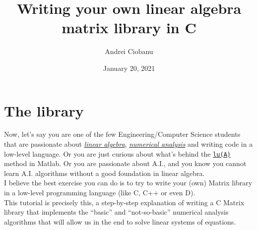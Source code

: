 

\usepackage{titling}
\usepackage{alltt}
\usepackage{multirow}
\usepackage{graphicx}
\usepackage[table]{xcolor}

\def\pt{\textstyle{.}}
\def\ttindent{\ \ \ \ }

\setlength{\parindent}{0mm}

\title{Writing your own linear algebra matrix library in C}
\author{Andrei Ciobanu}
\date{January 20, 2021}



\maketitle

\thispagestyle{empty} \pagestyle{myheadings}

\def\theequation{\arabic{section}.\arabic{equation}}    %

\section{ The library }

Now, let’s say you are one of the few Engineering/Computer Science students that are passionate about \href{https://en.wikipedia.org/wiki/Linear_algebra}{\it linear algebra}, \href{https://en.wikipedia.org/wiki/Numerical_analysis}{\it numerical analysis} and writing code in a low-level language. Or you are just curious about what’s behind the \href{https://www.mathworks.com/help/matlab/ref/lu.html}{\tt lu(A)} method in Matlab. Or you are passionate about A.I., and you know you cannot learn A.I. algorithms without a good foundation in linear algebra.
\\

I believe the best exercise you can do is to try to write your (own) Matrix library in a low-level programming language (like C, C++ or even D).
\\

This tutorial is precisely this, a step-by-step explanation of writing a C Matrix library that implements the “basic” and “not-so-basic” numerical analysis algorithms that will allow us in the end to solve linear systems of equations.
\\

